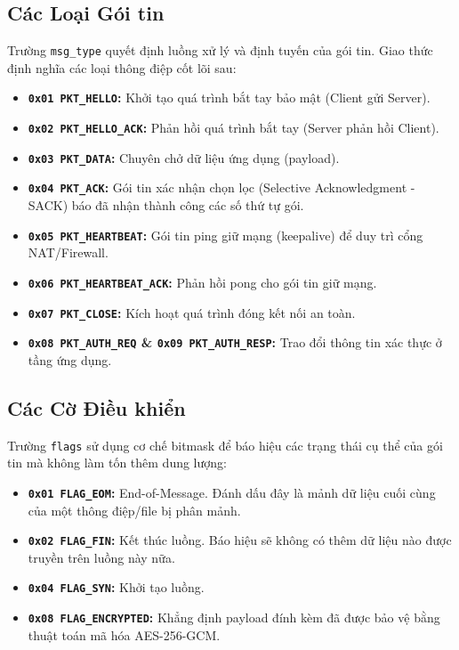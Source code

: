 \subsection{Các Loại Gói tin}
Trường \texttt{msg\_type} quyết định luồng xử lý và định tuyến của gói tin. Giao thức định nghĩa các loại thông điệp cốt lõi sau:

\begin{itemize}
    \item \textbf{\texttt{0x01 PKT\_HELLO}:} Khởi tạo quá trình bắt tay bảo mật (Client gửi Server).
    \item \textbf{\texttt{0x02 PKT\_HELLO\_ACK}:} Phản hồi quá trình bắt tay (Server phản hồi Client).
    \item \textbf{\texttt{0x03 PKT\_DATA}:} Chuyên chở dữ liệu ứng dụng (payload).
    \item \textbf{\texttt{0x04 PKT\_ACK}:} Gói tin xác nhận chọn lọc (Selective Acknowledgment - SACK) báo đã nhận thành công các số thứ tự gói.
    \item \textbf{\texttt{0x05 PKT\_HEARTBEAT}:} Gói tin ping giữ mạng (keepalive) để duy trì cổng NAT/Firewall.
    \item \textbf{\texttt{0x06 PKT\_HEARTBEAT\_ACK}:} Phản hồi pong cho gói tin giữ mạng.
    \item \textbf{\texttt{0x07 PKT\_CLOSE}:} Kích hoạt quá trình đóng kết nối an toàn.
    \item \textbf{\texttt{0x08 PKT\_AUTH\_REQ} \& \textbf{\texttt{0x09 PKT\_AUTH\_RESP}}:} Trao đổi thông tin xác thực ở tầng ứng dụng.
\end{itemize}

\subsection{Các Cờ Điều khiển}
Trường \texttt{flags} sử dụng cơ chế bitmask để báo hiệu các trạng thái cụ thể của gói tin mà không làm tốn thêm dung lượng:

\begin{itemize}
    \item \textbf{\texttt{0x01 FLAG\_EOM}:} End-of-Message. Đánh dấu đây là mảnh dữ liệu cuối cùng của một thông điệp/file bị phân mảnh.
    \item \textbf{\texttt{0x02 FLAG\_FIN}:} Kết thúc luồng. Báo hiệu sẽ không có thêm dữ liệu nào được truyền trên luồng này nữa.
    \item \textbf{\texttt{0x04 FLAG\_SYN}:} Khởi tạo luồng.
    \item \textbf{\texttt{0x08 FLAG\_ENCRYPTED}:} Khẳng định payload đính kèm đã được bảo vệ bằng thuật toán mã hóa AES-256-GCM.
\end{itemize}


